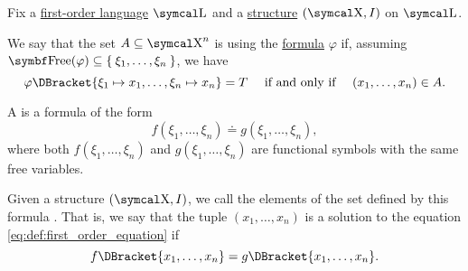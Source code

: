 \begin{definition}\label{def:first_order_definability}
  Fix a \hyperref[def:first_order_syntax]{first-order language} \( \CL \) and a \hyperref[def:first_order_structure]{structure} \( (\CX, I) \) on \( \CL \).

  We say that the set \( A \subseteq \CX^n \) is  using the \hyperref[def:first_order_syntax]{formula} \( \varphi \) if, assuming \( {\Bold{Free}(\varphi) \subseteq \Set{ \xi_1, \ldots, \xi_n }} \), we have
  \begin{equation*}
    \varphi\DBracket{\xi_1 \mapsto x_1, \ldots, \xi_n \mapsto x_n} = T \quad\T{if and only if}\quad (x_1, \ldots, x_n) \in A.
  \end{equation*}
\end{definition}

\begin{definition}\label{def:first_order_equation}
  A  is a formula of the form
  \begin{equation}\label{eq:def:first_order_equation}
    f(\xi_1, \ldots, \xi_n) \doteq g(\xi_1, \ldots, \xi_n),
  \end{equation}
  where both \( f(\xi_1, \ldots, \xi_n) \) and \( g(\xi_1, \ldots, \xi_n) \) are functional symbols with the same free variables.

  Given a structure \( (\CX, I) \), we call the elements of the set defined by this formula . That is, we say that the tuple \( (x_1, \ldots, x_n) \) is a solution to the equation \eqref{eq:def:first_order_equation} if
  \begin{equation*}
    f\DBracket{x_1, \ldots, x_n} = g\DBracket{x_1, \ldots, x_n}.
  \end{equation*}
\end{definition}

